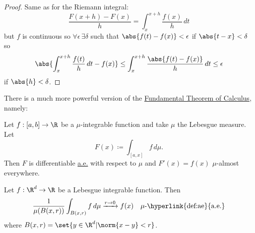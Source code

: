 \documentclass{article}
\newcommand{\1}[1]{\mathbbm{1}_{#1}}
\begin{document}

\begin{proof}
    Same as for the Riemann integral:
    \begin{equation*}
        \frac{F(x+h) - F(x)}{h} = \int_x^{x+h} \frac{f(x)}{h} \,dt
    \end{equation*}
    but $f$ is continuous so $\forall \epsilon \, \exists \delta$ such that $\abs{f(t) - f(x)} < \epsilon $ if $\abs{t - x} < \delta$ so
    \begin{equation*}
        \abs{\int_x^{x+h} \frac{f(t)}{h} \, dt - f(x)} \leq \int_x^{x+h} \frac{\abs{f(t) - f(x)}}{h} \,dt \leq \epsilon
    \end{equation*}
    if $\abs{h} < \delta$.
\end{proof}

\begin{remark}
    There is a much more powerful version of the \hyperlink{thm:ftoc}{Fundamental Theorem of Calculus}, namely:
\end{remark}

\begin{thm}
    Let $f: [a, b] \to \R$ be a $\mu$-integrable function and take $\mu$ the Lebesgue measure.
    Let
    \begin{equation*}
        F(x) \coloneqq \int_{[a,x]} f \, d\mu.
    \end{equation*}
    Then $F$ is differentiable \hyperlink{def:ae}{a.e.} with respect to $\mu$ and $F'(x) = f(x)$ $\mu$-almost everywhere.
\end{thm}

\begin{thm}
    Let $f: \R^d \to \R$ be a Lebesgue integrable function. Then
    \begin{equation*}
        \frac{1}{\mu(B(x, r))} \int_{B(x, r)} f \, d\mu \xrightarrow{r \to 0} f(x) \quad \mu\text{-\hyperlink{def:ae}{a.e.}}
    \end{equation*}
    where $B(x,r) = \set{y \in \R^d | \norm{x - y} < r}$.
\end{thm}
\end{document}
